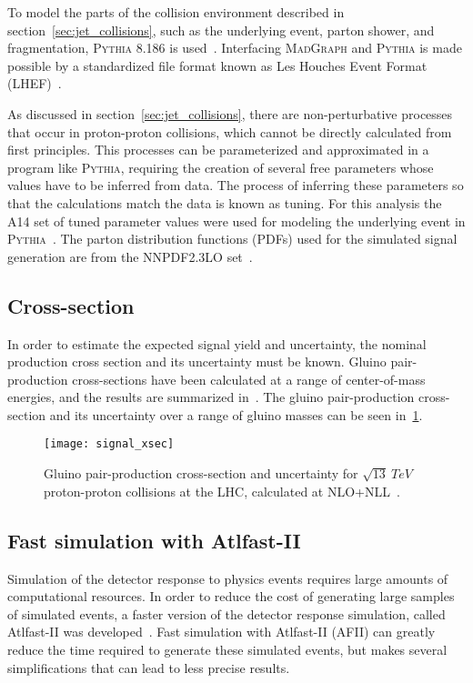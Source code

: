 To model the parts of the collision environment described in section~\ref{sec:jet_collisions}, such as the underlying event, parton shower, and fragmentation, \textsc{Pythia} 8.186 is used~\cite{signal-pythia}.
Interfacing \textsc{MadGraph} and \textsc{Pythia} is made possible by a standardized file format known as Les Houches Event Format (LHEF)~\cite{signal-lhef}.

As discussed in section~\ref{sec:jet_collisions}, there are non-perturbative processes that occur in proton-proton collisions, which cannot be directly calculated from first principles.
This processes can be parameterized and approximated in a program like \textsc{Pythia}, requiring the creation of several free parameters whose values have to be inferred from data.
The process of inferring these parameters so that the calculations match the data is known as tuning.
For this analysis the A14 set of tuned parameter values were used for modeling the underlying event in \textsc{Pythia}~\cite{signal-pythia-a14,signal-pythia-tunes}.
The parton distribution functions (PDFs) used for the simulated signal generation are from the NNPDF2.3LO set~\cite{signal-nnpdf}.

\subsection{Cross-section}\label{subsec:signal_cross_section}
In order to estimate the expected signal yield and uncertainty, the nominal production cross section and its uncertainty must be known.
Gluino pair-production cross-sections have been calculated at a range of center-of-mass energies, and the results are summarized in~\cite{signal-xsec}.
The gluino pair-production cross-section and its uncertainty over a range of gluino masses can be seen in~\ref{fig:signal_xsec}.

\begin{figure}[!ht]\centering
    \texttt{[image: signal\_xsec]}
    \caption{Gluino pair-production cross-section and uncertainty for $\sqrt{13}~TeV$ proton-proton collisions at the LHC, calculated at NLO+NLL~\cite{signal-xsec}.}
    \label{fig:signal_xsec}
\end{figure}

\subsection{Fast simulation with Atlfast-II}\label{subsec:fastsim}

Simulation of the detector response to physics events requires large amounts of computational resources.
In order to reduce the cost of generating large samples of simulated events, a faster version of the detector response simulation, called Atlfast-II was developed~\cite{mc-atlfast}.
Fast simulation with Atlfast-II (AFII) can greatly reduce the time required to generate these simulated events, but makes several simplifications that can lead to less precise results.

